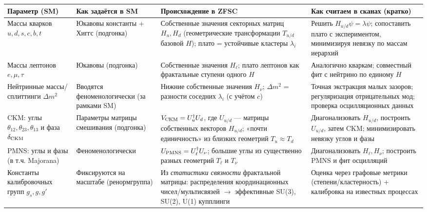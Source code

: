 

\begin{table}[h!]
\centering
\small
\setlength{\tabcolsep}{6pt}
\renewcommand{\arraystretch}{1.25}
\begin{tabular}{p{3.4cm} p{3.6cm} p{6.2cm} p{4.2cm}}
\toprule
\textbf{Параметр (SM)} & \textbf{Как задаётся в SM} & \textbf{Происхождение в ZFSC} & \textbf{Как считаем в сканах (кратко)}\\
\midrule

Массы кварков $u,d,s,c,b,t$ &
Юкавовы константы + Хиггс (подгонка) &
Собственные значения секторных матриц $H_{u},H_{d}$ (геометрические трансформации $T_{u/d}$ базовой $H$); плато = устойчивые кластеры $\lambda_i$ &
Решить $H_{u/d}\psi=\lambda\psi$; сопоставить плато с экспериментом, минимизируя невязку по массам иерархий \\

Массы лептонов $e,\mu,\tau$ &
Юкавовы (подгонка) &
Собственные значения $H_{\ell}$; плато лептонов как фрактальные ступени одного $H$ &
Аналогично кваркам; совместный фит с нейтрино по единому $H$ \\

Нейтринные массы/сплиттинги $\Delta m^2$ &
Вводятся феноменологически (за рамками SM) &
Нижние собственные значения $H_\nu$; $\Delta m^2$ = разности соседних $\lambda_i$ (с учётом $c$) &
Точная экстракция малых зазоров; регуляризация отрицательных мод; проверка осцилляционных данных \\

CKM: углы $\theta_{12},\theta_{23},\theta_{13}$ и фаза $\delta_{\rm CKM}$ &
Параметры матрицы смешивания (подгонка) &
$V_{\rm CKM} = U_u^\dagger U_d$, где $U_{u/d}$ — матрицы собственных векторов $H_{u/d}$; «почти единичность» из близких геометрий $T_u\approx T_d$ &
Диагонализовать $H_{u/d}$, построить $U_{u/d}$, затем CKM; минимизировать невязку углов и фазы \\

PMNS: углы и фазы (в т.ч. Majorana) &
Феноменологически &
$U_{\rm PMNS}=U_\ell^\dagger U_\nu$; большие углы из существенно разных геометрий $T_\ell$ и $T_\nu$ &
Диагонализовать $H_{\ell},H_{\nu}$; построить PMNS и фит осцилляций \\

Константы калибровочных групп $g_s,g,g'$ &
Фиксируются на масштабе (ренормгруппа) &
Из \emph{статистики связности} фрактальной матрицы: распределения координационных чисел/мультисвязей $\to$ эффективные SU(3), SU(2), U(1) купплинги &
Оценка через графовые метрики (степени/кластерность) + калибровка на известных процессах \\


\end{tabular}
\end{table}
